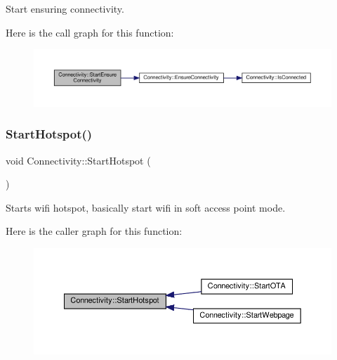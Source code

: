 Start ensuring connectivity. 

Here is the call graph for this function\+:
\nopagebreak
\begin{figure}[H]
\begin{center}
\leavevmode
\includegraphics[width=350pt]{classConnectivity_a15482263a17c51293756870cdb516f81_cgraph}
\end{center}
\end{figure}
\mbox{\label{classConnectivity_af7622ce70021dd32fd1ba18f62f4df62}} 
\subsubsection{\texorpdfstring{Start\+Hotspot()}{StartHotspot()}}
{\footnotesize\ttfamily void Connectivity\+::\+Start\+Hotspot (\begin{DoxyParamCaption}{ }\end{DoxyParamCaption})\hspace{0.3cm}{\ttfamily [private]}}



Starts wifi hotspot, basically start wifi in soft access point mode. 

Here is the caller graph for this function\+:
\nopagebreak
\begin{figure}[H]
\begin{center}
\leavevmode
\includegraphics[width=350pt]{classConnectivity_af7622ce70021dd32fd1ba18f62f4df62_icgraph}
\end{center}
\end{figure}
\mbox{\label{classConnectivity_a08efeeef7c1096e4244224846f70f04c}} 
